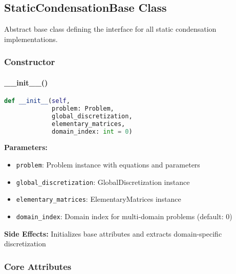 \subsection{StaticCondensationBase Class}
\label{subsec:static_condensation_base}

Abstract base class defining the interface for all static condensation implementations.

\subsubsection{Constructor}

\paragraph{\_\_init\_\_()}\leavevmode
\begin{lstlisting}[language=Python, caption=StaticCondensationBase Constructor]
def __init__(self, 
             problem: Problem, 
             global_discretization, 
             elementary_matrices, 
             domain_index: int = 0)
\end{lstlisting}

\textbf{Parameters:}
\begin{itemize}
    \item \texttt{problem}: Problem instance with equations and parameters
    \item \texttt{global\_discretization}: GlobalDiscretization instance
    \item \texttt{elementary\_matrices}: ElementaryMatrices instance
    \item \texttt{domain\_index}: Domain index for multi-domain problems (default: 0)
\end{itemize}

\textbf{Side Effects:} Initializes base attributes and extracts domain-specific discretization

\subsubsection{Core Attributes}

